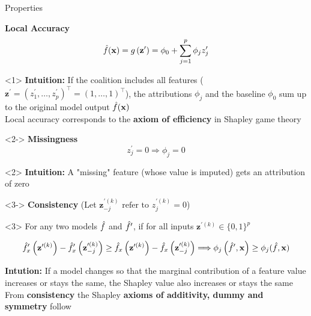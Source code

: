 \documentclass[10pt,compress,t,notes=noshow, xcolor=table]{beamer}
\begin{document}
\begin{frame}{Properties}

\textbf{Local Accuracy}
$$
\hat{f}(\mathbf{x})=g\left(\mathbf{z}^{\prime}\right)=\phi_{0}+\sum_{j=1}^{p} \phi_{j} z_{j}^{\prime}
$$

\begin{onlyenv}<1>
\textbf{Intuition:} If the coalition includes all features ($\mathbf{z}^{\prime} = (z^{\prime}_1, \dots, z^{\prime}_p)^\top = (1, \dots, 1)^\top $), the attributions $\phi_j$ and the baseline $\phi_0$ sum up to the original model output $\hat{f}(\mathbf{x})$\\\medskip
Local accuracy corresponds to the \textbf{axiom of efficiency} in Shapley game theory

\end{onlyenv}

\begin{onlyenv}<2->
\textbf{Missingness}
$$
z_{j}^{\prime}=0 \Longrightarrow \phi_{j}=0
$$
\end{onlyenv}

\begin{onlyenv}<2>
\textbf{Intuition:}  A "missing" feature (whose value is imputed) gets an attribution of zero
\end{onlyenv}

\begin{onlyenv}<3->
\textbf{Consistency} (Let $\mathbf{z}^{\prime (k)}_{-j} \text{ refer to } z_{j}^{\prime (k)}=0$) \\
\end{onlyenv}

\begin{onlyenv}<3>
For any two models $\hat{f}$ and $\hat{f}^{\prime}$, if for all inputs $\mathbf{z}^{\prime (k)} \in \{0, 1\}^p$

$$
\hat{f}_{x}^{\prime}\left(\mathbf{z}^{\prime (k)}\right)-\hat{f}_{x}^{\prime}\left(\mathbf{z}^{\prime (k)}_{-j}\right) \geq \hat{f}_{x}\left(\mathbf{z}^{\prime (k)}\right)-\hat{f}_{x}\left(\mathbf{z}^{\prime (k)} _{-j}\right) \Longrightarrow \phi_{j}\left(\hat{f}^{\prime}, \mathbf{x}\right) \geq \phi_{j}(\hat{f}, \mathbf{x})
$$

\textbf{Intution:} If a model changes so that the marginal contribution of a feature value increases or stays the same, the Shapley value also increases or stays the same\\\medskip
From \textbf{consistency} the Shapley \textbf{axioms of additivity, dummy and symmetry} follow
\end{onlyenv}


\end{frame}

\endlecture
\end{document}
